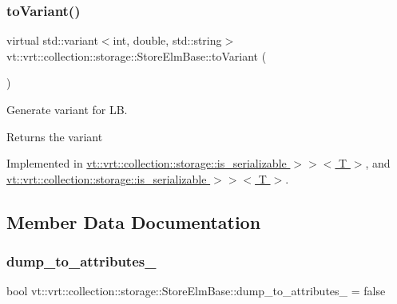 \subsubsection{\texorpdfstring{to\+Variant()}{toVariant()}}
{\footnotesize\ttfamily virtual std\+::variant$<$int, double, std\+::string$>$ vt\+::vrt\+::collection\+::storage\+::\+Store\+Elm\+Base\+::to\+Variant (\begin{DoxyParamCaption}{ }\end{DoxyParamCaption})\hspace{0.3cm}{\ttfamily [pure virtual]}}



Generate variant for LB. 

\begin{DoxyReturn}{Returns}
the variant 
\end{DoxyReturn}


Implemented in \hyperlink{structvt_1_1vrt_1_1collection_1_1storage_1_1_store_elm_3_01_t_00_01typename_01std_1_1enable__if_f645d7011e081ebef1092328b0917bfc_a7eea2c008b62018472a0b5f544320788}{vt\+::vrt\+::collection\+::storage\+::is\+\_\+serializable $>$$>$$<$ T $>$}, and \hyperlink{structvt_1_1vrt_1_1collection_1_1storage_1_1_store_elm_3_01_t_00_01typename_01std_1_1enable__if_947e0655769addb625fb511f777768bd_a7eea2c008b62018472a0b5f544320788}{vt\+::vrt\+::collection\+::storage\+::is\+\_\+serializable $>$$>$$<$ T $>$}.



\subsection{Member Data Documentation}
\mbox{\label{structvt_1_1vrt_1_1collection_1_1storage_1_1_store_elm_base_ac60d51135f5498642631bd0d8e515a20}} 
\subsubsection{\texorpdfstring{dump\+\_\+to\+\_\+attributes\+\_\+}{dump\_to\_attributes\_}}
{\footnotesize\ttfamily bool vt\+::vrt\+::collection\+::storage\+::\+Store\+Elm\+Base\+::dump\+\_\+to\+\_\+attributes\+\_\+ = false\hspace{0.3cm}{\ttfamily [protected]}}

